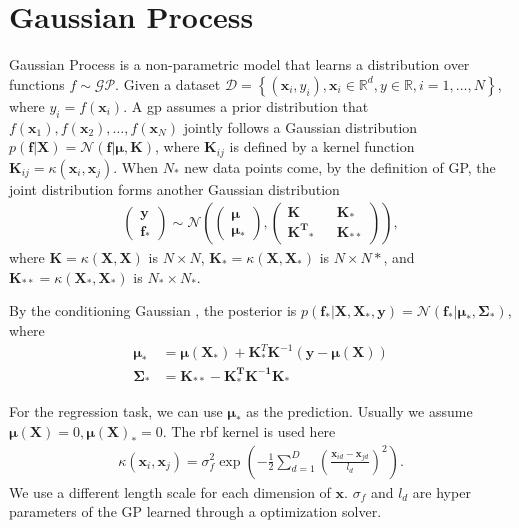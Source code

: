 \section{Gaussian Process}
\label{sec:gp}
Gaussian Process is a non-parametric model that learns a distribution over functions $f\sim \mathcal{GP}$.
Given a dataset 
$\mathcal{D} = \left\{(\mathbf{x}_i, y_i), \mathbf{x}_i \in \mathbb{R}^d, y \in \mathbb{R}, i=1,\dots, N \right\}$, 
where $y_{i} = f(\mathbf{x}_i)$.
A \gls{gp} assumes a prior distribution that 
$f(\mathbf{x}_{1}), f(\mathbf{x}_{2}), \dots, f(\mathbf{x}_{N})$ 
jointly follows a Gaussian distribution $p(\mathbf{f}|\mathbf{X}) = \mathcal{N}(\mathbf{f}|\mathbf{\mu}, \mathbf{K})$,
where $\mathbf{K}_{ij}$ is defined by a kernel function $\mathbf{K}_{ij} = \kappa(\mathbf{x}_i, \mathbf{x}_j)$.
When $N_{*}$ new data points come, by the definition of GP, the joint distribution forms another Gaussian distribution
\begin{align}
\begin{pmatrix} \mathbf{y}\\ \mathbf{f_*}\end{pmatrix} \sim \mathcal{N}\left(
\begin{pmatrix} \mathbf{\mu} \\ \mathbf{\mu}_{*}\end{pmatrix}, 
\begin{pmatrix} \mathbf{K} && \mathbf{K}_*\\ \mathbf{K^T}_* && \mathbf{K}_{**}\end{pmatrix}
\right),
\end{align}
where $\mathbf{K}=\kappa(\mathbf{X}, \mathbf{X})$ is $N\times N$, $\mathbf{K}_*=\kappa(\mathbf{X}, \mathbf{X}_*)$ is $N\times N{*}$, and $\mathbf{K}_{**}=\kappa(\mathbf{X}_*, \mathbf{X}_*)$ is $N_*\times N_*$.

By the conditioning Gaussian \cite{rasmussen2003gaussian}, the posterior is $p(\mathbf{f}_*|\mathbf{X}, \mathbf{X}_*, \mathbf{y}) = \mathcal{N}(\mathbf{f}_*|\mathbf{\mu}_*, \mathbf{\Sigma}_*)$, where
\begin{align}
\mathbf{\mu}_* & = \mathbf{\mu(X_*)} + \mathbf{K}^T_*\mathbf{K}^{-1}(\mathbf{y-\mu(X)})\label{eq:gp-mu}\\
\mathbf{\Sigma}_* & = \mathbf{K_{**}-K_*^TK^{-1}K_*}
\label{eq:gp-cov}
\end{align}

For the regression task, we can use $\mathbf{\mu}_*$ as the prediction.
Usually we assume $\mathbf{\mu(X)} = 0, \mathbf{\mu(X)}_* = 0$. The \gls{rbf} kernel is used here
\begin{align}
\kappa(\mathbf{x}_i, \mathbf{x}_j) = \sigma_f^2 \exp\left(-\frac{1}{2}\sum_{d=1}^{D}\left(\frac{\mathbf{x}_{id}-\mathbf{x}_{jd}}{l_d}\right)^2\right).
\end{align}
We use a different length scale for each dimension of $\mathbf{x}$.
$\sigma_{f}$ and $l_{d}$ are hyper parameters of the GP learned through a optimization solver.

